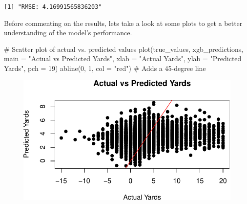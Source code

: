 \documentclass[
  super,
  preprint,
  3p]{elsarticle}
\newenvironment{Shaded}{\begin{snugshade}}{\end{snugshade}}
\newcommand{\AttributeTok}[1]{\textcolor[rgb]{0.40,0.45,0.13}{#1}}
\newcommand{\CommentTok}[1]{\textcolor[rgb]{0.37,0.37,0.37}{#1}}
\newcommand{\DecValTok}[1]{\textcolor[rgb]{0.68,0.00,0.00}{#1}}
\newcommand{\FunctionTok}[1]{\textcolor[rgb]{0.28,0.35,0.67}{#1}}
\newcommand{\NormalTok}[1]{\textcolor[rgb]{0.00,0.23,0.31}{#1}}
\newcommand{\OtherTok}[1]{\textcolor[rgb]{0.00,0.23,0.31}{#1}}
\newcommand{\SpecialCharTok}[1]{\textcolor[rgb]{0.37,0.37,0.37}{#1}}
\newcommand{\StringTok}[1]{\textcolor[rgb]{0.13,0.47,0.30}{#1}}
\begin{document}
\begin{Shaded}
\end{Shaded}

\begin{verbatim}
[1] "RMSE: 4.16991565836203"
\end{verbatim}

Before commenting on the results, lets take a look at some plots to get
a better understanding of the model's performance.

\begin{Shaded}
\begin{Highlighting}[]
\CommentTok{\# Scatter plot of actual vs. predicted values}
\FunctionTok{plot}\NormalTok{(true\_values, xgb\_predictions, }\AttributeTok{main =} \StringTok{"Actual vs Predicted Yards"}\NormalTok{, }\AttributeTok{xlab =} \StringTok{"Actual Yards"}\NormalTok{, }\AttributeTok{ylab =} \StringTok{"Predicted Yards"}\NormalTok{, }\AttributeTok{pch =} \DecValTok{19}\NormalTok{)}
\FunctionTok{abline}\NormalTok{(}\DecValTok{0}\NormalTok{, }\DecValTok{1}\NormalTok{, }\AttributeTok{col =} \StringTok{"red"}\NormalTok{)  }\CommentTok{\# Adds a 45{-}degree line}
\end{Highlighting}
\end{Shaded}

\begin{figure}[H]

{\centering \includegraphics{project_report_files/figure-pdf/unnamed-chunk-14-1.pdf}

}

\end{figure}
\end{document}
